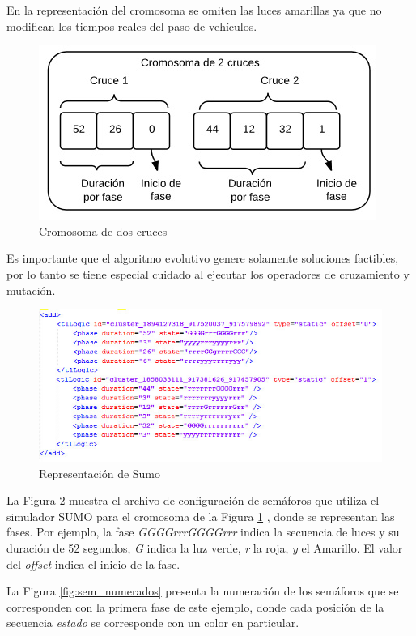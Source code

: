 En la representación del cromosoma se omiten las luces amarillas ya que no modifican los tiempos reales del paso de vehículos.

\begin{figure}[h]
	\centering
	\includegraphics[width=0.7\linewidth]{Figures/cromosoma1}
	\caption{Cromosoma de dos cruces}
	\label{fig:cromosoma1}
\end{figure}

Es importante que el algoritmo evolutivo genere solamente soluciones factibles, por lo tanto se tiene especial cuidado al ejecutar los operadores de cruzamiento y mutación.

\begin{figure}[H]
	\centering
	\includegraphics[width=\linewidth]{Figures/rep_sumo2}
	\caption{Representación de Sumo}
	\label{fig:rep_sumo}
\end{figure}

La Figura \ref{fig:rep_sumo} muestra el archivo de configuración de semáforos que utiliza el simulador SUMO para el cromosoma de la Figura \ref{fig:cromosoma1} , donde se representan las fases. Por ejemplo, la fase \emph{GGGGrrrGGGGrrr} indica la secuencia de luces y su duración de 52 segundos, \emph{G} indica la luz verde, \emph{r} la roja, \emph{y} el Amarillo. El valor del \emph{offset} indica el inicio de la fase. 

La Figura \ref{fig:sem_numerados} presenta la numeración de los semáforos que se corresponden con la primera fase de este ejemplo, donde cada posición de la secuencia \emph{estado} se corresponde con un color en particular. 

